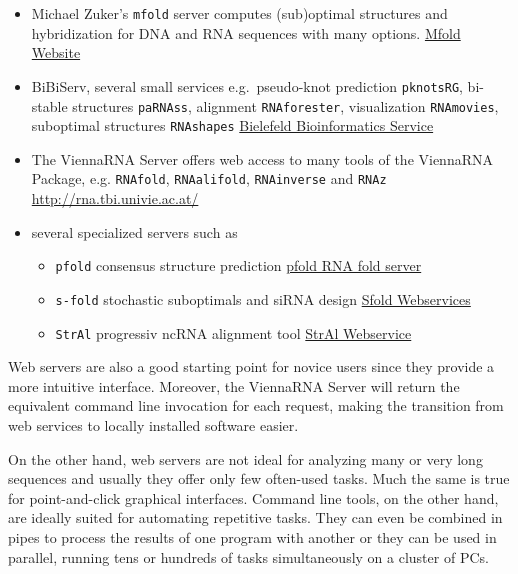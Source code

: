 \documentclass[a4paper]{article}
\begin{document}
\begin{itemize}
\item Michael Zuker's \texttt{mfold} server computes (sub)optimal structures
  and hybridization for DNA and RNA sequences with many options.\newline
  \href{http://mfold.rna.albany.edu/?q=mfold}{Mfold Website}
\item BiBiServ, several small services e.g.\ pseudo-knot prediction
  \texttt{pknotsRG}, bi-stable structures \texttt{paRNAss}, alignment
  \texttt{RNAforester}, visualization \texttt{RNAmovies}, suboptimal
  structures \texttt{RNAshapes}\newline
  \href{https://bibiserv.cebitec.uni-bielefeld.de/rna}{Bielefeld Bioinformatics Service}
\item The ViennaRNA Server offers web access to many tools of the ViennaRNA
Package, e.g. \texttt{RNAfold}, \texttt{RNAalifold}, \texttt{RNAinverse} and \texttt{RNAz}\newline
  \url{http://rna.tbi.univie.ac.at/}
\item several specialized servers such as \newline
\begin{itemize}
  \item \texttt{pfold} consensus structure prediction\newline
  \href{http://www.daimi.au.dk/~compbio/rnafold/}{ pfold RNA fold server}\newline
  \item \texttt{s-fold} stochastic suboptimals and siRNA design \newline
  \href{http://sfold.wadsworth.org/}{Sfold Webservices}\newline
  \item \texttt{StrAl} progressiv ncRNA alignment tool\newline
  \href{http://www.biophys.uni-duesseldorf.de/stral/}{StrAl Webservice}
\end{itemize}
\end{itemize}

Web servers are also a good starting point for novice users since they
provide a more intuitive interface. Moreover, the ViennaRNA Server will
return the equivalent command line invocation for each request, making the
transition from web services to locally installed software easier.

On the other hand, web servers are not ideal for analyzing many or very long
sequences and usually they offer only few often-used tasks.
Much the same is true for point-and-click graphical interfaces.
Command line tools, on the other hand, are ideally suited for automating
repetitive tasks. They can even be combined in pipes to process the
results of one program with another or they can be used in parallel, running
tens or hundreds of tasks simultaneously on a cluster of PCs.
\end{document}
